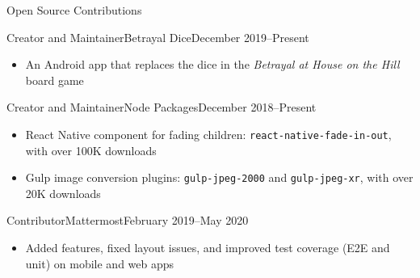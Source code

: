\documentclass[]{mcdowellcv}
\begin{document}
	\begin{cvsection}{Open Source Contributions}
		\begin{cvsubsection}{Creator and Maintainer}{Betrayal Dice}{December 2019--Present}
			\begin{itemize}
				\item An Android app that replaces the dice in the \textit{Betrayal at House on the Hill} board game
			\end{itemize}
		\end{cvsubsection}
		
		\begin{cvsubsection}{Creator and Maintainer}{Node Packages}{December 2018--Present}
			\begin{itemize}
				\item React Native component for fading children: \texttt{react-native-fade-in-out}, with over 100K downloads
				\item Gulp image conversion plugins: \texttt{gulp-jpeg-2000} and \texttt{gulp-jpeg-xr}, with over 20K downloads
			\end{itemize}
		\end{cvsubsection}	

		\begin{cvsubsection}{Contributor}{Mattermost}{February 2019--May 2020}
			\begin{itemize}
				\item Added features, fixed layout issues, and improved test coverage (E2E and unit) on mobile and web apps
			\end{itemize}
		\end{cvsubsection}
	\end{cvsection}
	
\end{document}
